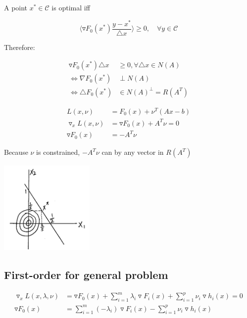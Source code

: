 A point $x^*\in\mathcal{C}$ is optimal iff 

\begin{equation*}
\langle\triangledown F_0(x^*)\frac{y-x^*}{\triangle x}\rangle\geq 0,\quad \forall y\in\mathcal{C}
\end{equation*}

Therefore:

\begin{align*}
\triangledown F_0(x^*)\triangle x &\geq 0, \forall \triangle x\in N(A)\\
\Leftrightarrow \nabla F_0(x^*) &\perp N(A)\\
\Leftrightarrow \triangle F_0(x^*) &\in N(A)^{\perp} = R(A^T)
\end{align*}

\begin{align*}
L(x,\nu) &= F_0(x) +\nu^T(Ax-b)\\
\triangledown_xL(x,\nu) &= \triangledown F_0(x) + A^T\nu  = 0\\
\triangledown F_0(x) &= -A^T\nu
\end{align*}


Because $\nu$ is constrained, $-A^{T}\nu$ can by any vector in $R(A^T)$

\begin{marginfigure}
	\centering
	\includegraphics[width=1.8in,height=1.8in]{figures/ch10/figure1204_4.png}
\end{marginfigure}



\subsection{First-order for general problem}

\begin{align*}
\triangledown_x L(x,\lambda,\nu) &= \triangledown F_0(x) + \sum^m_{i=1}\lambda_i\triangledown F_i(x) + \sum^p_{i=1}\nu_i \triangledown h_i(x) = 0\\
\triangledown F_0(x) &= \sum^m_{i=1}(-\lambda_i)\triangledown F_i(x) - \sum^p_{i=1}\nu_i\triangledown h_i(x)\\
\end{align*}


